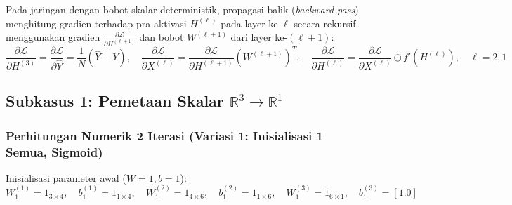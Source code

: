 \documentclass[11pt,a4paper]{article}
\def\mathbf#1{#1}%
\theoremstyle{plain}
\theoremstyle{definition}
\theoremstyle{remark}
\begin{document}
\noindent Pada jaringan dengan bobot skalar deterministik, propagasi balik (\textit{backward pass}) menghitung gradien terhadap pra-aktivasi $H^{(\ell)}$ pada layer ke-$\ell$ secara rekursif menggunakan gradien $\frac{\partial \mathcal{L}}{\partial H^{(\ell+1)}}$ dan bobot $W^{(\ell+1)}$ dari layer ke-$(\ell+1)$:
\begin{equation}
    \frac{\partial \mathcal{L}}{\partial H^{(3)}} = \frac{\partial \mathcal{L}}{\partial \hat{Y}} = \frac{1}{N}(\hat{Y} - Y), \quad
    \frac{\partial \mathcal{L}}{\partial X^{(\ell)}} = \frac{\partial \mathcal{L}}{\partial H^{(\ell+1)}} \left( W^{(\ell+1)} \right)^T, \quad
    \frac{\partial \mathcal{L}}{\partial H^{(\ell)}} = \frac{\partial \mathcal{L}}{\partial X^{(\ell)}} \odot f'\!\left( H^{(\ell)} \right), \quad \ell = 2, 1 \label{eq:chain_rule_h}
\end{equation}

\subsection{Subkasus 1: Pemetaan Skalar \texorpdfstring{$\mathbb{R}^3 \to \mathbb{R}^1$}{R3 -> R1}}
\label{subsec:skalar_r3_r1}

\subsubsection{Perhitungan Numerik 2 Iterasi (Variasi 1: Inisialisasi 1 Semua, Sigmoid)}
\label{subsubsec:skalar_r1_hitung2iterasi}

\noindent Inisialisasi parameter awal ($W = \mathbf{1}, \mathbf{b} = \mathbf{1}$):
\begin{equation}
    W^{(1)}_1 = \mathbf{1}_{3 \times 4}, \quad \mathbf{b}^{(1)}_1 = \mathbf{1}_{1 \times 4}, \quad W^{(2)}_1 = \mathbf{1}_{4 \times 6}, \quad \mathbf{b}^{(2)}_1 = \mathbf{1}_{1 \times 6}, \quad W^{(3)}_1 = \mathbf{1}_{6 \times 1}, \quad \mathbf{b}^{(3)}_1 = [1.0]
\end{equation}
\end{document}
